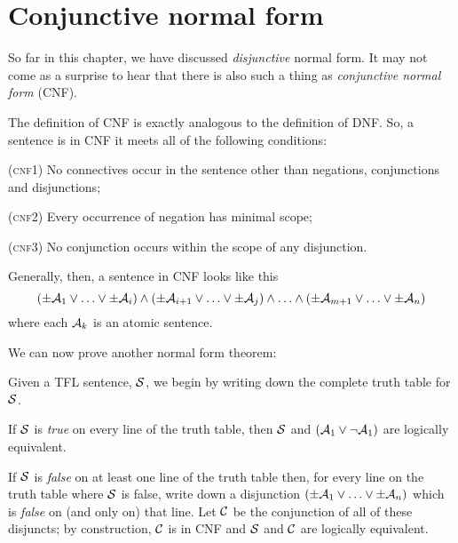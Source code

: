 \section{Conjunctive normal form}
\label{s:CNF}

So far in this chapter, we have discussed \emph{disjunctive} normal form. It may not come as a surprise to hear that there is also such a thing as \emph{conjunctive normal form} (CNF).

The definition of CNF is exactly analogous to the definition of DNF. So, a sentence is in CNF \emph{\ifeff} it meets all of the following conditions:
	\begin{compactlist}
		\item[(\textsc{cnf1})] No connectives occur in the sentence other than negations, conjunctions and disjunctions;
		\item[(\textsc{cnf2})] Every occurrence of negation has minimal scope;
		\item[(\textsc{cnf3})] No conjunction occurs within the scope of any disjunction.
	\end{compactlist}
Generally, then, a sentence in CNF looks like this
	$$(\pm \mathcal{A}_1 \lor \ldots \lor \pm \mathcal{A}_i) \land (\pm \mathcal{A}_{i+1} \lor \ldots \lor \pm\mathcal{A}_j) \land \ldots \land (\pm\mathcal{A}_{m+1} \lor\ldots \lor \pm \mathcal{A}_n)$$
where each $\mathcal{A}_k$ is an atomic sentence.

We can now prove another normal form theorem:

        
	Given a TFL sentence, $\mathcal{S}$, we begin by writing down the complete truth table for $\mathcal{S}$.
	
	If $\mathcal{S}$ is \emph{true} on every line of the truth table, then $\mathcal{S}$ and $(\mathcal{A}_1 \vee \neg \mathcal{A}_1)$ are logically equivalent.
	
	If $\mathcal{S}$ is \emph{false} on at least one line of the truth table then, for every line on the truth table where $\mathcal{S}$ is false, write down a disjunction $(\pm\mathcal{A}_1 \vee \ldots \vee \pm\mathcal{A}_n)$ which is \emph{false} on (and only on) that line. Let $\mathcal{C}$ be the conjunction of all of these disjuncts; by construction, $\mathcal{C}$ is in CNF and $\mathcal{S}$ and $\mathcal{C}$ are logically equivalent.

